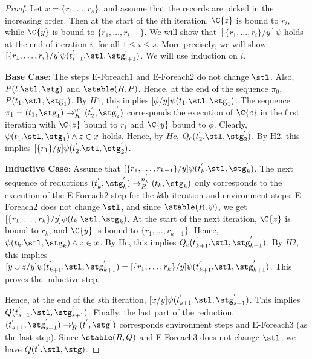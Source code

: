 \begin{proof}
Let $x = \{r_1, \ldots, r_s\}$, and assume that the records are picked in the increasing order. Then at the start of the $i$th iteration, $\C{z}$ is bound to $r_i$, while $\C{y}$ is bound to $\{r_1, \ldots, r_{i-1}\}$. We will show that $[\{r_1,\ldots, r_i\} / y]\psi$ holds at the end of iteration $i$, for all $1 \leq i \leq s$. More precisely, we will show $[\{r_1,\ldots, r_i\} / y]\psi(t_{i+1}^{'}.\stl, \stg_{i+1}^{'})$. We will use induction on $i$.

\textbf{Base Case}: The steps E-Foreach1 and E-Foreach2 do not change $\stl$. Also, $P(t.\stl, \stg)$ and $\stable(R, P)$. Hence, at the end of the sequence $\pi_0$, $P(t_{1}.\stl, \stg_{1})$. By $H1$, this implies $[\phi / y] \psi(t_1.\stl, \stg_1)$. The sequence $\pi_1 = (t_{1}, \stg_{1}) \rightarrow_{R}^{n_1} (t_{2}^{'}, \stg_{2}^{'})$ corresponds the execution of $\C{c}$ in the first iteration with $\C{z}$ bound to $r_1$ and $\C{y}$ bound to $\phi$. Clearly, $\psi(t_1.\stl, \stg_1) \wedge z \in x$ holds. Hence, by $Hc$, $Q_c(t_{2}^{'}.\stl, \stg_{2}^{'})$. By H2, this implies $[\{r_1\} / y] \psi(t_2^{'}.\stl, \stg_{2}^{'})$.

\textbf{Inductive Case}: Assume that $[\{r_1,\ldots, r_{k-1}\} / y]\psi(t_{k}^{'}.\stl, \stg_{k}^{'})$. The next sequence of reductions $(t_{k}^{'}, \stg_{k}^{'}) \rightarrow_{R}^{n_{k}^{'}} (t_k, \stg_k)$ only corresponds to the execution of the E-Foreach2 step for the $k$th iteration and environment steps. E-Foreach2 does not change $\stl$, and since $\stable(R, \psi)$, we get $[\{r_1,\ldots, r_k\} / y]\psi(t_{k}.\stl, \stg_{k})$. At the start of the next iteration, $\C{z}$ is bound to $r_{k}$, and $\C{y}$ is bound to $\{r_1, \ldots, r_{k-1}\}$. Hence, $\psi(t_k.\stl, \stg_k) \wedge z \in x$. By Hc, this implies $Q_c(t_{k+1}^{'}.\stl, \stg_{k+1}^{'})$. By $H2$, this implies $[y \cup z / y] \psi(t_{k+1}^{'}.\stl, \stg_{k+1}^{'}) = [\{r_1, \ldots, r_k\} / y]\psi(t_{k+1}^{'}.\stl, \stg_{k+1}^{'})$. This proves the inductive step.

Hence, at the end of the $s$th iteration, $[x / y]\psi(t_{s+1}^{'}.\stl, \stg_{s+1}^{'})$. This implies $Q(t_{s+1}^{'}.\stl, \stg_{s+1}^{'})$. Finally, the last part of the reduction, $(t_{s+1}^{'}, \stg_{s+1}^{'}) \rightarrow_{R}^{l} (t^{'}, \stg^{'})$ corresponds environment steps and E-Foreach3 (as the last step). Since $\stable(R, Q)$ and E-Foreach3 does not change $\stl$, we have $Q(t^{'}.\stl, \stg)$. 

\end{proof}

